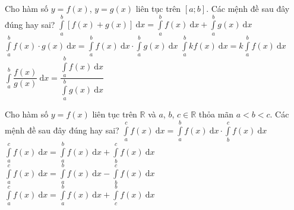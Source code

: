\begin{ex}%
Cho hàm số $y=f(x)$, $y=g(x)$ liên tục trên $\left[a;b\right]$. Các mệnh đề sau đây đúng hay sai?
\choiceTF
{\True $\displaystyle\int\limits_a^b{\left[f(x)+g(x)\right]\mathrm{~d}x}=\displaystyle\int\limits_a^b{f(x)}\mathrm{~d}x+\displaystyle\int\limits_a^b{g(x)\mathrm{~d}x}$}
{$\displaystyle\int\limits_a^b{f(x)\cdot g(x)\mathrm{~d}x}=\displaystyle\int\limits_a^b{f(x)\mathrm{~d}x}\cdot\displaystyle\int\limits_a^b{g(x)\mathrm{~d}x}$}
{\True $\displaystyle\int\limits_a^b{kf(x)\mathrm{~d}x=k\displaystyle\int\limits_a^b{f(x)\mathrm{~d}x}}$}
{$\displaystyle\int\limits_a^b{\dfrac{f(x)}{g(x)}\mathrm{~d}x}=\dfrac{\displaystyle\int\limits_a^bf(x)\mathrm{~d}x}{\displaystyle\int\limits_a^bg(x)\mathrm{~d}x}$}
\end{ex}
%
\begin{ex}%
Cho hàm số $y=f(x)$ liên tục trên $\mathbb{R}$ và $a$, $b$, $c\in\mathbb{R}$ thỏa mãn $a<b<c$. Các mệnh đề sau đây đúng hay sai?
\choiceTF
{$\displaystyle\int\limits_a^c{f(x)\mathrm{~d}x=\displaystyle\int\limits_a^b{f(x)\mathrm{~d}x}}\cdot \displaystyle\int\limits_b^c{f(x)\mathrm{~d}x}$}
{\True $\displaystyle\int\limits_a^c{f(x)\mathrm{~d}x=\displaystyle\int\limits_a^b{f(x)\mathrm{~d}x}}+\displaystyle\int\limits_b^c{f(x)\mathrm{~d}x}$}
{$\displaystyle\int\limits_a^c{f(x)\mathrm{~d}x=\displaystyle\int\limits_a^b{f(x)\mathrm{~d}x}}-\displaystyle\int\limits_b^c{f(x)\mathrm{~d}x}$}
{$\displaystyle\int\limits_a^c{f(x)\mathrm{~d}x=\displaystyle\int\limits_a^b{f(x)\mathrm{~d}x}}+\displaystyle\int\limits_c^b{f(x)\mathrm{~d}x}$}
\end{ex}
%
